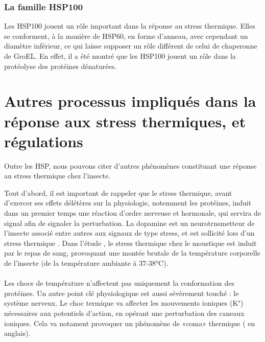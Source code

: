 \subsubsection{La famille HSP100} %
\label{ssub:la_famille_hsp100}

Les HSP100 jouent un rôle important dans la réponse au stress thermique. %
Elles se conforment, à la manière de HSP60, en forme d'anneau, avec cependant un diamètre inférieur, ce qui laisse supposer un rôle différent de celui de chaperonne de GroEL.
En effet, il a été montré que les HSP100 jouent un rôle dans la protéolyse des protéines dénaturées.

%


	\section{Autres processus impliqués dans la réponse aux stress thermiques, et régulations} %
	\label{sec:rep_misc}
%		

Outre les HSP, nous pouvons citer d'autres phénomènes constituant une réponse au stress thermique chez l'insecte.

Tout d'abord, il est important de rappeler que le stress thermique, avant d'exercer ses effets délétères sur la physiologie, notemment les protéines, induit dans un premier temps une réaction d'ordre nerveuse et hormonale, qui servira de signal afin de signaler la perturbation.
La dopamine est un neurotrnsmetteur de l'insecte associé entre autres aux signaux de type stress, et est sollicité lors d'un stress thermique \cite{andersen2006}. Dans l'étude \cite{andersen2006}, le stress thermique chez le moustique est induit par le repas de sang, provoquant une montée brutale de la température corporelle de l'insecte (de la température ambiante à 37-38°C).


\paragraph{}

Les chocs de température n'affectent pas uniquement la conformation des protéines.
Un autre point clé physiologique est aussi sévèrement touché : le système nerveux.
Le choc termique va affecter les mouvements ioniques (K⁺) nécessaires aux potentiels d'action, en opérant une perturbation des caneaux ioniques.
Cela va notament provoquer un phénomène de «coma» thermique ( en anglais)\cite{armstrong2012}.


